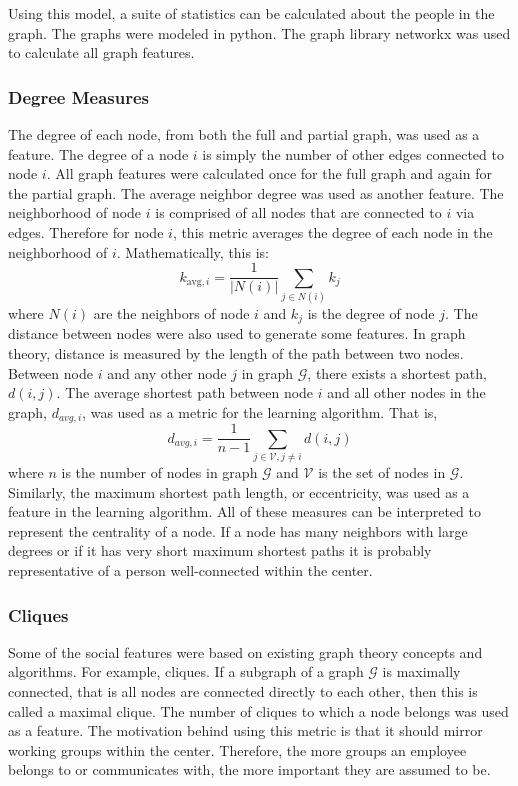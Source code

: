 \documentclass[12pt]{report}
\begin{document}
Using this model, a suite of statistics can be calculated about the people in the graph.  The graphs were modeled in python.  The graph library networkx \cite{hagberg-2008-exploring} was used to calculate all graph features.

\subsubsection{Degree Measures}
The degree of each node, from both the full and partial graph, was used as a feature.  
The degree of a node $i$ is simply the number of other edges connected to node $i$.
All graph features were calculated once for the full graph and again for the partial graph.
The average neighbor degree was used as another feature.
The neighborhood of node $i$ is comprised of all nodes that are connected to $i$ via edges.
Therefore for node $i$, this metric averages the degree of each node in the neighborhood of $i$.
Mathematically, this is:
\begin{equation}
k_{\text{avg},i} = \frac{1}{|N(i)|}\sum_{j \in N(i)}k_j
\end{equation}
where $N(i)$ are the neighbors of node $i$ and $k_j$ is the degree of node $j$.
The distance between nodes were also used to generate some features.
In graph theory, distance is measured by the length of the path between two nodes.
Between node $i$ and any other node $j$ in graph $\mathcal{G}$, there exists a shortest path, $d(i,j)$.
The average shortest path between node $i$ and all other nodes in the graph, $d_{avg,i}$, was used as a metric for the learning algorithm.
That is,
\begin{equation}
d_{avg,i} = \frac{1}{n-1}\sum_{j \in \mathcal{V}, j\neq i}d(i,j)
\end{equation}
where $n$ is the number of nodes in graph $\mathcal{G}$ and $\mathcal{V}$ is the set of nodes in $\mathcal{G}$.
Similarly, the maximum shortest path length, or eccentricity, was used as a feature in the learning algorithm.
All of these measures can be interpreted to represent the centrality of a node.
If a node has many neighbors with large degrees or if it has very short maximum shortest paths it is probably representative of a person well-connected within the center.

\subsubsection{Cliques}
Some of the social features were based on existing graph theory concepts and algorithms.
For example, cliques.
If a subgraph of a graph $\mathcal{G}$ is maximally connected, that is all nodes are connected directly to each other, then this is called a maximal clique.
The number of cliques to which a node belongs was used as a feature.
The motivation behind using this metric is that it should mirror working groups within the center.
Therefore, the more groups an employee belongs to or communicates with, the more important they are assumed to be.
\end{document}

